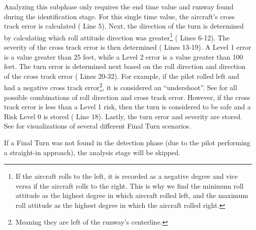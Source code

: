             Analyzing this subphase only requires the end time value and runway found during the identification stage.  For this single time value, the aircraft's cross track error is calculated ( Line 5).  Next, the direction of the turn is determined by calculating which roll attitude direction was greater\footnote{If the aircraft rolls to the left, it is recorded as a negative degree and vice versa if the aircraft rolls to the right.  This is why we find the minimum roll attitude as the highest degree in which aircraft rolled left, and the maximum roll attitude as the highest degree in which the aircraft rolled right.} ( Lines 6-12).  The severity of the cross track error is then determined ( Lines 13-19).  A Level 1 error is a value greater than 25 feet, while a Level 2 error is a value greater than 100 feet.  The turn error is determined next based on the roll direction and direction of the cross track error ( Lines 20-32).  For example, if the pilot rolled left and had a negative cross track error\footnote{Meaning they are left of the runway's centerline.}, it is considered an ``undershoot''.  See  for all possible combinations of roll direction and cross track error.  However, if the cross track error is less than a Level 1 risk, then the turn is considered to be safe and a Risk Level 0 is stored ( Line 18).  Lastly, the turn error and severity are stored.  See  for visualizations of several different Final Turn scenarios.
            
            If a Final Turn was not found in the detection phase (due to the pilot performing a straight-in approach), the analysis stage will be skipped.
            
